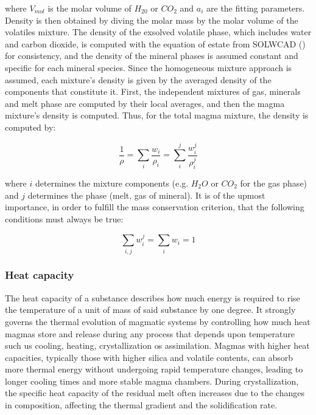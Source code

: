 where $V_{mol}$ is the molar volume of $H_20$ or $CO_2$ and $a_i$ are the fitting parameters. Density is then obtained by diving the molar mass by the molar volume of the volatiles mixture.
The density of the exsolved volatile phase, which includes water and carbon dioxide, is computed with the equation of estate from SOLWCAD (\cite{papale2006}) for consistency, and the density of the mineral phases is assumed constant and specific for each mineral species.
Since the homogeneous mixture approach is assumed, each mixture's density is given by the averaged density of the components that constitute it. First, the independent mixtures of gas, minerals and melt phase are computed by their local averages, and then the magma mixture's density is computed. Thus, for the total magma mixture, the density is computed by:

\begin{equation}
	\frac{1}{\rho} = \sum_i \frac{w_i}{\rho_i} = \sum_i^j \frac{w_i^j}{\rho_i^j}
\end{equation}

where $i$ determines the mixture components (e.g. $H_2O$ or $CO_2$ for the gas phase) and $j$ determines the phase (melt, gas of mineral). It is of the upmost importance, in order to fulfill the mass conservation criterion, that the following conditions must always be true:

\begin{equation}
	\sum_{i,j} w_i^j = \sum_i w_i = 1
\end{equation}

\subsubsection{Heat capacity}
The heat capacity of a substance describes how much energy is required to rise the temperature of a unit of mass of said substance by one degree. It strongly governs the thermal evolution of magmatic systems by controlling how much heat magmas store and release during any process that depends upon temperature such us cooling, heating, crystallization os assimilation. Magmas with higher heat capacities, typically those with higher silica and volatile contents, can absorb more thermal energy without undergoing rapid temperature changes, leading to longer cooling times and more stable magma chambers. During crystallization, the specific heat capacity of the residual melt often increases due to the changes in composition, affecting the thermal gradient and the solidification rate.

